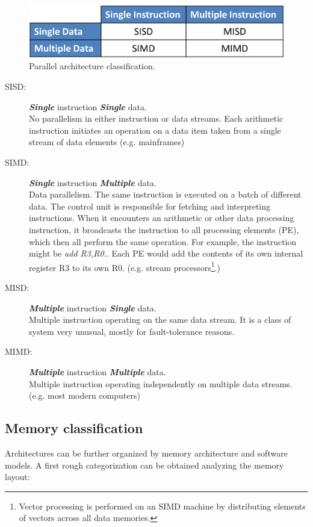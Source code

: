 \begin{figure}
\includegraphics[scale=0.28]{./images/parallelClassification}
\caption[Parallel architecture classification]{Parallel architecture
classification.}
\label{fig:parallelClassification1}
\end{figure}


\begin{description}
\item[SISD:] \textit{\textbf{Single}} instruction \textit{\textbf{Single}}
data.\hfill\\
No parallelism in either instruction or data streams. Each arithmetic
instruction initiates an operation on a data item taken from a single stream of data elements (e.g. mainframes)
\item[SIMD:] \textit{\textbf{Single}} instruction
\textit{\textbf{Multiple}} data. \hfill \\ Data parallelism. The same
instruction is executed on a batch of different data. The control unit is
responsible for fetching and interpreting instructions. When it encounters an
arithmetic or other data processing instruction, it broadcasts the instruction
to all processing elements (PE), which then all perform the same operation. For
example, the instruction might be \textit{add R3,R0.}. Each PE would add the
contents of its own internal register R3 to its own R0. (e.g. stream
processors\footnote{Vector processing is performed on an SIMD machine by distributing
elements of vectors across all data memories.}.)
\item[MISD:] \textit{\textbf{Multiple}} instruction
\textit{\textbf{Single}} data. \hfill \\ Multiple instruction operating on the
same data stream. It is a class of system very unusual, mostly for fault-tolerance reasons.
\item[MIMD:] \textit{\textbf{Multiple}} instruction
\textit{\textbf{Multiple}} data. \hfill \\ Multiple instruction operating
independently on multiple data streams.
(e.g. most modern computers)
\end{description}



\subsection{Memory classification}
Architectures can be further organized by memory architecture and software
models. 
A first rough categorization can be obtained analyzing the memory layout:

